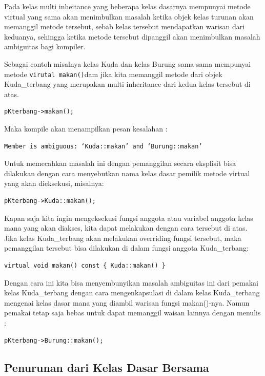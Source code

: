 Pada kelas multi inheitance yang beberapa kelas dasarnya mempunyai
metode virtual yang sama akan menimbulkan masalah ketika objek kelas
turunan akan memanggil metode tersebut, sebab kelas tersebut mendapatkan
warisan dari keduanya, sehingga ketika metode tersebut dipanggil akan
menimbulkan masalah ambiguitas bagi kompiler.

Sebagai contoh misalnya kelas Kuda dan kelas Burung sama-sama mempunyai
metode \texttt{virutal\ makan()}dam jika kita memanggil metode dari
objek Kuda\_terbang yang merupakan multi inheritance dari kedua kelas
tersebut di atas.

\begin{verbatim}
pKterbang->makan();
\end{verbatim}

Maka kompile akan menampilkan pesan kesalahan :

\begin{verbatim}
Member is ambiguous: ‘Kuda::makan’ and ‘Burung::makan’
\end{verbatim}

Untuk memecahkan masalah ini dengan pemanggilan secara eksplisit bisa
dilakukan dengan cara menyebutkan nama kelas dasar pemilik metode
virtual yang akan dieksekusi, misalnya:

\begin{verbatim}
pKterbang->Kuda::makan();
\end{verbatim}

Kapan saja kita ingin mengeksekusi fungsi anggota atau variabel anggota
kelas mana yang akan diakses, kita dapat melakukan dengan cara tersebut
di atas. Jika kelas Kuda\_terbang akan melakukan overriding fungsi
tersebut, maka pemanggilan tersebut bisa dilakukan di dalam fungsi
anggota Kuda\_terbang:

\begin{verbatim}
virtual void makan() const { Kuda::makan() }
\end{verbatim}

Dengan cara ini kita bisa menyembunyikan masalah ambiguitas ini dari
pemakai kelas Kuda\_terbang dengan cara mengenkapsulasi di dalam kelas
Kuda\_terbang mengenai kelas dasar mana yang diambil warisan fungsi
makan()-nya. Namun pemakai tetap saja bebas untuk dapat memanggil waisan
lainnya dengan menulis :

\begin{verbatim}
pKterbang->Burung::makan();
\end{verbatim}

\subsection{Penurunan dari Kelas Dasar
Bersama}\label{penurunan-dari-kelas-dasar-bersama}

